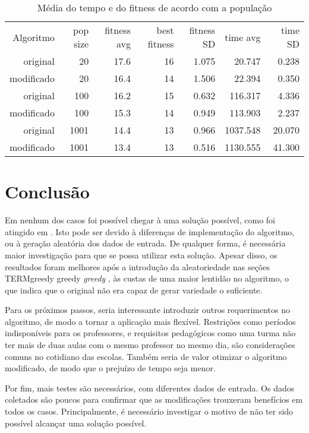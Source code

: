 \documentclass[12pt,a4paper]{article}
\def\foreign#1{%
  \ifcsname TERM#1\endcsname%
  #1%
  \else%
  \emph{#1}%
  \expandafter\gdef\csname TERM#1\endcsname{}%
\fi}
\begin{document}
\begin{table}
  \caption{Média do tempo e do fitness de acordo com a população}
  \centering
  \begin{tabular}{ r r r r r r r }
    Algoritmo & pop size & fitness avg & best fitness & fitness SD & time avg & time SD \\
     original &   20 & 17.6 & 16 & 1.075 &   20.747 &  0.238 \\
   modificado &   20 & 16.4 & 14 & 1.506 &   22.394 &  0.350 \\
     original &  100 & 16.2 & 15 & 0.632 &  116.317 &  4.336 \\
   modificado &  100 & 15.3 & 14 & 0.949 &  113.903 &  2.237 \\
     original & 1001 & 14.4 & 13 & 0.966 & 1037.548 & 20.070 \\
   modificado & 1001 & 13.4 & 13 & 0.516 & 1130.555 & 41.300 \\
  \end{tabular}
\end{table}

\section{Conclusão}
Em nenhum dos casos foi possível chegar à uma solução possível, como foi
atingido em \cite{Raghavjee:2008:GASTP}. Isto pode ser devido à diferenças de
implementação do algoritmo, ou à geração aleatória dos dados de entrada. De
qualquer forma, é necessária maior investigação para que se possa utilizar esta
solução. Apesar disso, os resultados foram melhores após a introdução da
aleatoriedade nas seções \foreign{greedy}, às custas de uma maior lentidão no
algoritmo, o que indica que o original não era capaz de gerar variedade o
suficiente.

Para os próximos passos, seria interessante introduzir outros requerimentos no
algoritmo, de modo a tornar a aplicação mais flexível. Restrições como períodos
indisponíveis para os professores, e requisitos pedagógicos como uma turma não
ter mais de duas aulas com o mesmo professor no mesmo dia, são considerações
comuns no cotidiano das escolas. Também seria de valor otimizar o algoritmo
modificado, de modo que o prejuízo de tempo seja menor.

Por fim, mais testes são necessários, com diferentes dados de entrada. Os dados
coletados são poucos para confirmar que as modificações trouxeram benefícios em
todos os casos. Principalmente, é necessário investigar o motivo de não ter sido
possível alcançar uma solução possível.



\end{document}
